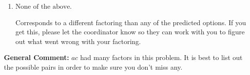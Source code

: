 \documentclass{extbook}[14pt]
\begin{document}
\begin{enumerate}
{\begin{enumerate}[label=\Alph*.]
 $(8x -5)(2x + 3)$, which corresponds to associating some factor of a to c.
\item \( \text{None of the above.} \)

 Corresponds to a different factoring than any of the predicted options. If you get this, please let the coordinator know so they can work with you to figure out what went wrong with your factoring.
\end{enumerate}

\textbf{General Comment:} $ac$ had many factors in this problem. It is best to list out the possible pairs in order to make sure you don't miss any.
}
\end{enumerate}
\end{document}
